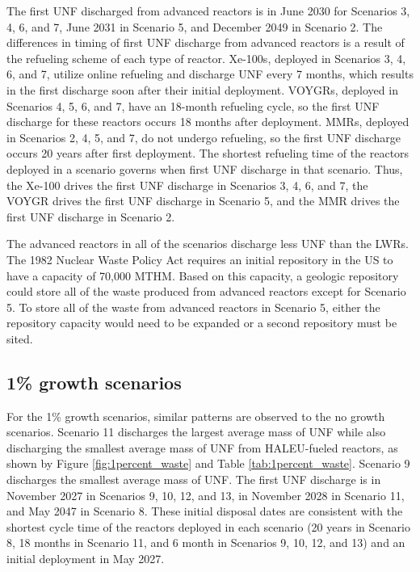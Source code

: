The first \gls{UNF} discharged from advanced reactors is in June 
2030 for Scenarios 3, 4, 6, and 7, June 2031 
in Scenario 5, and 
December 2049 in Scenario 2. The differences in timing of first \gls{UNF} 
discharge from advanced reactors is a result of the refueling scheme of 
each type of reactor. Xe-100s, deployed in Scenarios 3, 4, 6, 
and 7, utilize online refueling and discharge \gls{UNF} 
every 7 months, which results in the first discharge soon after their initial 
deployment. VOYGRs, deployed in Scenarios 4, 5, 6, and 7, have an 
18-month refueling cycle, so the first \gls{UNF} discharge for these 
reactors occurs 18 months after deployment. \glspl{MMR}, deployed in 
Scenarios 2, 4, 5, and 7, do not undergo refueling, so the first \gls{UNF} 
discharge occurs 20 years after first deployment. The shortest refueling 
time of the reactors deployed in a scenario governs when 
first \gls{UNF} discharge in that scenario. Thus, the Xe-100 drives the 
first \gls{UNF} discharge in 
Scenarios 3, 4, 6, and 7, the VOYGR drives the first \gls{UNF} discharge 
in Scenario 5, and the \gls{MMR} drives the first \gls{UNF} discharge in 
Scenario 2. 

The 
advanced reactors in all of the scenarios discharge 
less \gls{UNF} than the \glspl{LWR}. The 1982 Nuclear Waste Policy Act
\cite{noauthor_nuclear_1983} requires an initial 
repository in the US to have a capacity of 70,000 MTHM. Based on this 
capacity, a geologic repository could store 
all of the waste produced from advanced reactors except for Scenario 5. 
To store all of the waste from advanced reactors in Scenario 5, either 
the repository capacity would need to be expanded or a second repository 
must be sited.

\subsection{1\% growth scenarios}
For the 1\% growth scenarios, similar patterns are observed to the 
no growth scenarios. Scenario 11 discharges  
the largest average mass of \gls{UNF} while also discharging
the smallest average mass of \gls{UNF} from \gls{HALEU}-fueled 
reactors, as shown by  
Figure \ref{fig:1percent_waste} and Table \ref{tab:1percent_waste}. 
Scenario 9 discharges the smallest average mass of \gls{UNF}. The 
first \gls{UNF} discharge 
is in November 2027 in Scenarios 9, 10, 12, and 13, in 
November 2028 in Scenario 11, and May 2047 in Scenario 8. These initial 
disposal dates are consistent with the shortest cycle time of the 
reactors deployed in each scenario (20 years in Scenario 8, 18 months in 
Scenario 11, and 6 month in Scenarios 9, 10, 12, and 13) and an 
initial deployment in May 2027. 

